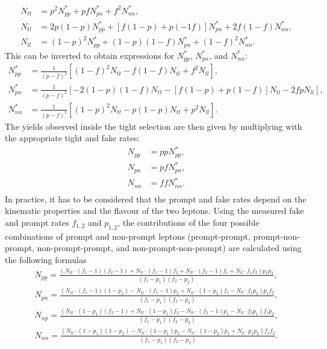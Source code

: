 \begin{align*}
N_{tt} &= p^2N_{pp}^{*} + pf N_{pn}^{*} + f^2N_{nn}^{*},\\
N_{tl} &= 2p(1-p)N_{pp}^{*} + [f(1-p)+p(-1f)]N_{pn}^{*} + 2f(1-f)N_{nn}^{*},\\
N_{ll} &= (1-p)^2N_{pp}^{*} + (1-p)(1-f)N_{pn}^{*} + (1-f)^2N_{nn}^{*}.
\end{align*}
This can be inverted to obtain expressions for $N_{pp}^{*}$, $N_{pn}^{*}$, and $N_{nn}^{*}$: 
\begin{align*}
N_{pp}^{*} &= \frac{1}{(p-f)^2}[(1-f)^2N_{tt}-f(1-f)N_{tl}+f^2N_{ll}],\\
N_{pn}^{*} &= \frac{1}{(p-f)^2}[-2(1-p)(1-f)N_{tt}-[f(1-p)+p(1-f)]N_{tl}-2fpN_{ll}],\\
N_{nn}^{*} &= \frac{1}{(p-f)^2}[(1-p)^2N_{tt}-p(1-p)N_{tl}+p^2N_{ll}].
\end{align*}
The yields observed inside the tight selection are then given by multiplying with the appropriate tight and fake rates:
\begin{align*}
N_{pp} &= ppN_{pp}^{*},\\
N_{pn} &= pfN_{pn}^{*},\\
N_{nn} &= ffN_{nn}^{*}.\\
\end{align*}
In practice, it has to be considered that the prompt and fake rates depend on the kinematic properties and the flavour of the two leptons. Using the measured fake and prompt rates $f_{1,2}$ and $p_{1,2}$, the contributions of the four possible combinations of prompt and non-prompt leptons (prompt-prompt, prompt-non-prompt, non-prompt-prompt, and non-prompt-non-prompt) are calculated using the following formulas
\begin{eqnarray*}
N_{pp} = \frac{(N_{tt}\cdot(f_1 -1)(f_2-1) + N_{tl}\cdot(f_1 -1)f_2 + N_{lt}\cdot (f_2-1)f_1 + N_{ll}\cdot f_1f_2)p_1p_2}{(f_1-p_1)(f_2-p_2)},\\
N_{pn} = \frac{(N_{tt}\cdot(f_1 -1)(1-p_2) - N_{tl}\cdot(f_1 -1)p_2 + N_{lt}\cdot (1-p_2)f_1 - N_{ll}\cdot f_1p_2)p_1f_2}{(f_1-p_1)(f_2-p_2)},\\
N_{np} = \frac{(N_{tt}\cdot(1 - p_1)(f_2 - 1) + N_{tl}\cdot(1-p_1)f_2 - N_{lt}\cdot (f_2-1)p_1 - N_{ll}\cdot f_2p_1)f_1p_2}{(f_1-p_1)(f_2-p_2)},\\
N_{nn} = \frac{(N_{tt}\cdot(1-p_1)(1-p_2) - N_{tl}\cdot (1-p_1)p_2 - N_{lt}\cdot (1-p_2)p_1 + N_{ll}\cdot p_1p_2)f_1f_2}{(f_1-p_1)(f_2-p_2)}.\\
\end{eqnarray*}
